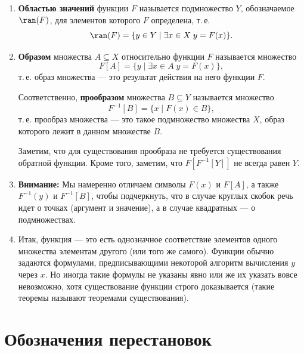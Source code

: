\begin{enumerate}
\item \textbf{Областью значений} функции $F$ называется подмножество $Y$, обозначаемое $\ran(F)$, для элементов которого $F$ определена, т.\,е.
$$
\ran(F) = \{y\in Y\mid\exists x\in X\;y=F(x)\}.
$$

\item \textbf{Образом} множества $A\subseteq X$ относительно функции $F$ называется множество
$$
F[A] = \{y\mid \exists x\in A\;y=F(x)\},
$$
т.\,е. образ множества --- это результат действия на него функции $F$.

Соответственно, \textbf{прообразом} множества $B\subseteq Y$ называется множество
$$
F^{-1}[B] = \{x\mid F(x)\in B\},
$$
т.\,е. прообраз множества --- это такое подмножество множества $X$, образ которого лежит в данном множестве $B$. 

Заметим, что для существования прообраза не требуется существования обратной функции. Кроме того, заметим, что $F[F^{-1}[Y]]$ не всегда равен $Y$.

\item \textbf{Внимание:} Мы намеренно отличаем символы $F(x)$ и $F[A]$, а также $F^{-1}(y)$ и $F^{-1}[B]$, чтобы подчеркнуть, что в случае круглых скобок речь идет о точках (аргумент и значение), а в случае квадратных --- о подмножествах.

\item Итак, функция --- это есть однозначное соответствие элементов одного множества элементам другого (или того же самого). Функции обычно задаются формулами, предписывающими некоторой алгоритм вычисления $y$ через $x$. Но иногда такие формулы не указаны явно или же их указать вовсе невозможно, хотя существование функции строго доказывается (такие теоремы называют теоремами существования).
\end{enumerate}




\section{Обозначения перестановок}



